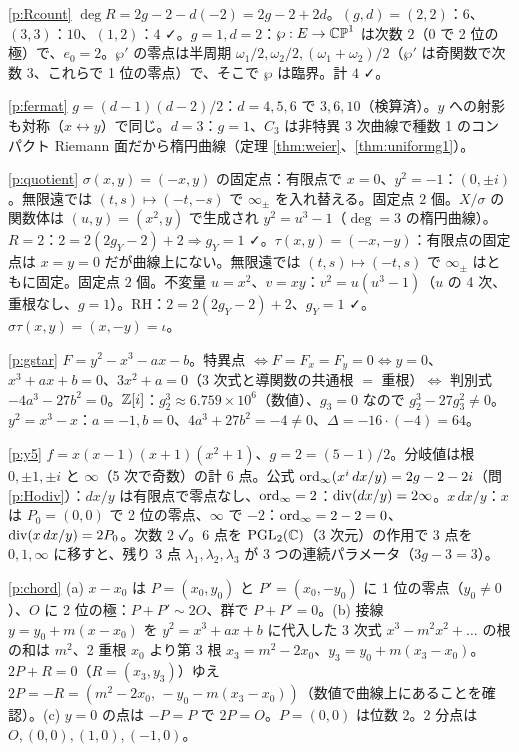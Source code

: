 \begin{sol}{\ref{p:Rcount}}
$\deg R=2g-2-d(-2)=2g-2+2d$。$(g,d)=(2,2)$：$6$、$(3,3)$：$10$、$(1,2)$：$4$ ✓。$g=1,d=2$：$\wp:E\to\mathbb{CP}^1$ は次数 $2$（$0$ で 2 位の極）で、$e_0=2$。$\wp'$ の零点は半周期 $\omega_1/2,\omega_2/2,(\omega_1+\omega_2)/2$（$\wp'$ は奇関数で次数 $3$、これらで 1 位の零点）で、そこで $\wp$ は臨界。計 $4$ ✓。
\end{sol}
\begin{sol}{\ref{p:fermat}}
$g=(d-1)(d-2)/2$：$d=4,5,6$ で $3,6,10$（検算済）。$y$ への射影も対称（$x\leftrightarrow y$）で同じ。$d=3$：$g=1$、$C_3$ は非特異 3 次曲線で種数 1 のコンパクト Riemann 面だから楕円曲線（定理 \ref{thm:weier}、\ref{thm:uniformg1}）。
\end{sol}
\begin{sol}{\ref{p:quotient}}
$\sigma(x,y)=(-x,y)$ の固定点：有限点で $x=0$、$y^2=-1$：$(0,\pm i)$。無限遠では $(t,s)\mapsto(-t,-s)$ で $\infty_\pm$ を入れ替える。固定点 $2$ 個。$X/\sigma$ の関数体は $(u,y)=(x^2,y)$ で生成され $y^2=u^3-1$（$\deg=3$ の楕円曲線）。$R=2$：$2=2(2g_Y-2)+2\Rightarrow g_Y=1$ ✓。$\tau(x,y)=(-x,-y)$：有限点の固定点は $x=y=0$ だが曲線上にない。無限遠では $(t,s)\mapsto(-t,s)$ で $\infty_\pm$ はともに固定。固定点 $2$ 個。不変量 $u=x^2$、$v=xy$：$v^2=u(u^3-1)$（$u$ の 4 次、重根なし、$g=1$）。RH：$2=2(2g_Y-2)+2$、$g_Y=1$ ✓。$\sigma\tau(x,y)=(x,-y)=\iota$。
\end{sol}
\begin{sol}{\ref{p:gstar}}
$F=y^2-x^3-ax-b$。特異点 $\iff F=F_x=F_y=0\iff y=0$、$x^3+ax+b=0$、$3x^2+a=0$（3 次式と導関数の共通根 $=$ 重根）$\iff$ 判別式 $-4a^3-27b^2=0$。$\mathbb Z[i]$：$g_2^3\approx6.759\times10^6$（数値）、$g_3=0$ なので $g_2^3-27g_3^2\ne0$。$y^2=x^3-x$：$a=-1,b=0$、$4a^3+27b^2=-4\ne0$、$\Delta=-16\cdot(-4)=64$。
\end{sol}
\begin{sol}{\ref{p:y5}}
$f=x(x-1)(x+1)(x^2+1)$、$g=2=(5-1)/2$。分岐値は根 $0,\pm1,\pm i$ と $\infty$（5 次で奇数）の計 $6$ 点。公式 $\operatorname{ord}_\infty(x^i\,dx/y)=2g-2-2i$（問 \ref{p:Hodiv}）：$dx/y$ は有限点で零点なし、$\operatorname{ord}_\infty=2$：$\operatorname{div}(dx/y)=2\infty$。$x\,dx/y$：$x$ は $P_0=(0,0)$ で 2 位の零点、$\infty$ で $-2$：$\operatorname{ord}_\infty=2-2=0$、$\operatorname{div}(x\,dx/y)=2P_0$。次数 $2$ ✓。6 点を $\mathrm{PGL}_2(\mathbb C)$（3 次元）の作用で 3 点を $0,1,\infty$ に移すと、残り 3 点 $\lambda_1,\lambda_2,\lambda_3$ が 3 つの連続パラメータ（$3g-3=3$）。
\end{sol}
\begin{sol}{\ref{p:chord}}
(a) $x-x_0$ は $P=(x_0,y_0)$ と $P'=(x_0,-y_0)$ に 1 位の零点（$y_0\ne0$）、$O$ に 2 位の極：$P+P'\sim2O$、群で $P+P'=0$。(b) 接線 $y=y_0+m(x-x_0)$ を $y^2=x^3+ax+b$ に代入した 3 次式 $x^3-m^2x^2+\dots$ の根の和は $m^2$、2 重根 $x_0$ より第 3 根 $x_3=m^2-2x_0$、$y_3=y_0+m(x_3-x_0)$。$2P+R=0$（$R=(x_3,y_3)$）ゆえ $2P=-R=(m^2-2x_0,\,-y_0-m(x_3-x_0))$（数値で曲線上にあることを確認）。(c) $y=0$ の点は $-P=P$ で $2P=O$。$P=(0,0)$ は位数 2。2 分点は $O,(0,0),(1,0),(-1,0)$。
\end{sol}

